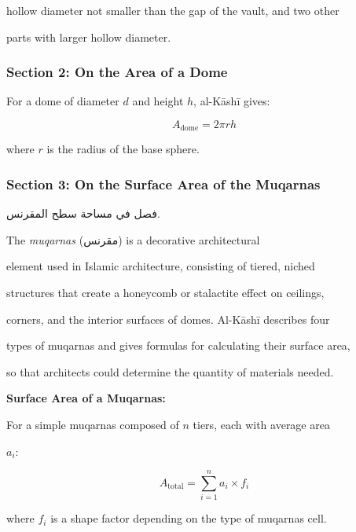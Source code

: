 \documentclass[11pt,a4paper]{article}
\newenvironment{arabicbox}{%

  \begin{framed}

  \begin{minipage}{\linewidth-2\fboxsep-2\fboxrule}

  \setlength{\parindent}{0pt}

  \linespread{1.3}\selectfont

}{%

  \end{minipage}

  \end{framed}

}
\newenvironment{mathalgo}{%

  \par\vspace{0.3cm}

  \begin{framed}

  \setlength{\parindent}{0pt}

}{%

  \end{framed}

  \par\vspace{0.3cm}

}
\newcommand{\ar}[1]{{\arabicfont\beginR #1\endR}}
\begin{document}
hollow diameter not smaller than the gap of the vault, and two other

parts with larger hollow diameter.



\subsubsection{Section 2: On the Area of a Dome}



For a dome of diameter $d$ and height $h$, al-K\=ash\=i gives:

\[

A_{\text{dome}} = 2\pi r h

\]

where $r$ is the radius of the base sphere.



\subsubsection{Section 3: On the Surface Area of the Muqarnas}



\begin{arabicbox}

\begin{Arabic}

فصل في مساحة سطح المقرنس.

\end{Arabic}

\end{arabicbox}



\vspace{0.3cm}



The \textit{muqarnas} (\ar{مقرنس}) is a decorative architectural

element used in Islamic architecture, consisting of tiered, niched

structures that create a honeycomb or stalactite effect on ceilings,

corners, and the interior surfaces of domes. Al-K\=ash\=i describes four

types of muqarnas and gives formulas for calculating their surface area,

so that architects could determine the quantity of materials needed.



\begin{mathalgo}

\textbf{Surface Area of a Muqarnas:}



For a simple muqarnas composed of $n$ tiers, each with average area

$a_i$:

\[

A_{\text{total}} = \sum_{i=1}^{n} a_i \times f_i

\]

where $f_i$ is a shape factor depending on the type of muqarnas cell.

\end{mathalgo}
\end{document}
